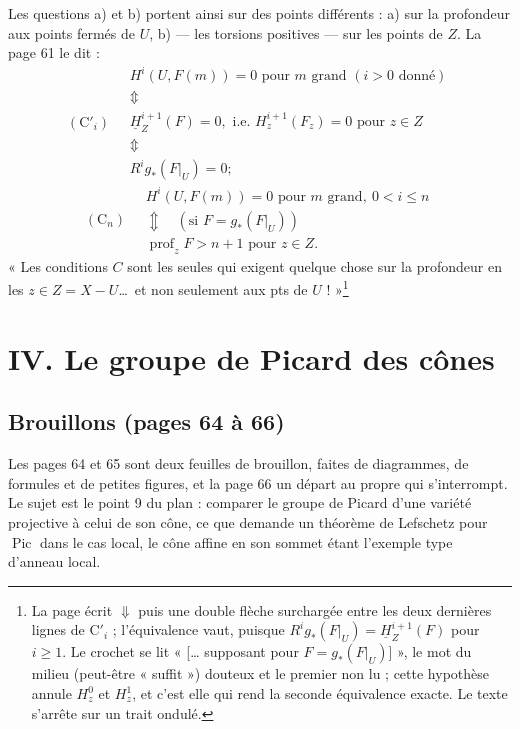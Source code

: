 \documentclass[11pt,a4paper]{article}
\begin{document}
Les questions a) et b) portent ainsi sur des points différents : a) sur la
profondeur aux points fermés de $U$, b) --- les torsions positives --- sur les
points de $Z$. La page 61 le dit :
\[
(\mathrm{C}'_i) \quad
\begin{array}{l}
  H^i(U, F(m)) = 0 \text{ pour } m \text{ grand } (i > 0 \text{ donné}) \\
  \Updownarrow \\
  \underline{H}^{i+1}_Z(F) = 0, \text{ i.e. } H^{i+1}_z(F_z) = 0 \text{ pour } z \in Z \\
  \Updownarrow \\
  R^i g_*(F|_U) = 0 ;
\end{array}
\]
\[
(\mathrm{C}_n) \quad
\begin{array}{l}
  H^i(U, F(m)) = 0 \text{ pour } m \text{ grand},\ 0 < i \leq n \\
  \Updownarrow \quad (\text{si } F = g_*(F|_U)) \\
  \operatorname{prof}_z F > n+1 \text{ pour } z \in Z .
\end{array}
\]
« Les conditions $C$ sont les seules qui exigent quelque chose sur la
profondeur en les $z \in Z = X - U$\ldots\ et non seulement aux pts de $U$
! »\footnote{La page écrit $\Downarrow$ puis une double flèche surchargée entre
les deux dernières lignes de $\mathrm{C}'_i$ ; l'équivalence vaut, puisque
$R^i g_*(F|_U) = \underline{H}^{i+1}_Z(F)$ pour $i \geq 1$. Le crochet se lit
« [… supposant pour $F = g_*(F|_U)$] », le mot du milieu (peut-être
« suffit ») douteux et le premier non lu ; cette hypothèse
annule $H^0_z$ et $H^1_z$, et c'est elle qui rend la seconde équivalence
exacte. Le texte s'arrête sur un trait ondulé.}

\section*{IV. Le groupe de Picard des cônes}

\subsection*{Brouillons (pages 64 à 66)}

Les pages 64 et 65 sont deux feuilles de brouillon, faites de diagrammes, de
formules et de petites figures, et la page 66 un départ au propre qui
s'interrompt. Le sujet est le point 9 du plan : comparer le groupe de Picard
d'une variété projective à celui de son cône, ce que demande un théorème de
Lefschetz pour $\operatorname{Pic}$ dans le cas local, le cône affine en
son sommet étant l'exemple type d'anneau local.
\end{document}
